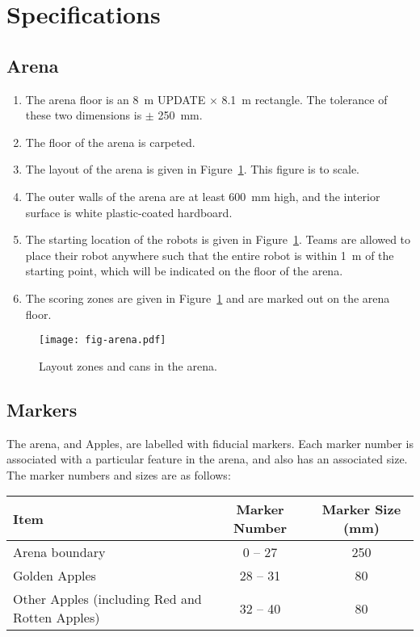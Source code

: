 \section{Specifications}
\label{sec:specs}

\subsection{Arena}
\label{spec:arena}

\begin{enumerate}
  \item The arena floor is an \SI{8}{m} UPDATE $\times$ \SI{8.1}{m} rectangle. The
        tolerance of these two dimensions is $\pm$ \SI{250}{mm}.
  \item The floor of the arena is carpeted.
  \item The layout of the arena is given in Figure~\ref{fig:arena}. This
        figure is to scale.
  \item The outer walls of the arena are at least \SI{600}{mm} high, and the
        interior surface is white plastic-coated hardboard.
  \item The starting location of the robots is given in Figure~\ref{fig:arena}.
        Teams are allowed to place their robot anywhere such that the entire
        robot is within \SI{1}{m} of the starting point, which will be
        indicated on the floor of the arena.
  \item The scoring zones are given in Figure~\ref{fig:arena} and are marked out
        on the arena floor.
\end{enumerate}

\begin{figure}
  \texttt{[image: fig-arena.pdf]}
  \caption{Layout zones and cans in the arena.}
  \label{fig:arena}
\end{figure}

\subsection{Markers}
\label{spec:markers}

The arena, and Apples, are labelled with fiducial markers. Each
marker number is associated with a particular feature in the arena,
and also has an associated size.  The marker numbers and sizes are
as follows:

\begin{center}
\begin{tabular}{lcc}
  \toprule
  \textbf{Item} & \textbf{Marker Number} & \textbf{Marker Size (\si{mm})} \\
  \midrule
  Arena boundary  &     0 -- 27   &   250 \\
  Golden Apples   &     28 -- 31  &   80  \\
  Other Apples (including Red and Rotten Apples) & 32 -- 40 & 80 \\
  \bottomrule
\end{tabular}
\end{center}

